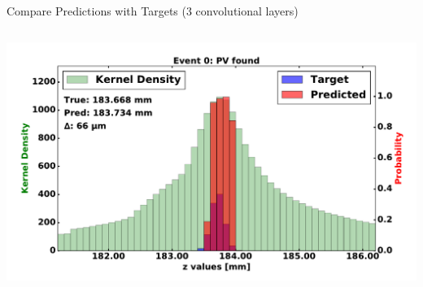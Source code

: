 \begin{frame}{Compare Predictions with Targets (3 convolutional layers)}
\begin{columns}[c]
\begin{center}
           \includegraphics[width=1\textwidth, height=0.45\textwidth, trim=18 0 18 0]{images/120000_3layer_03.pdf}
       \end{center}
  \end{columns}
\end{frame}


